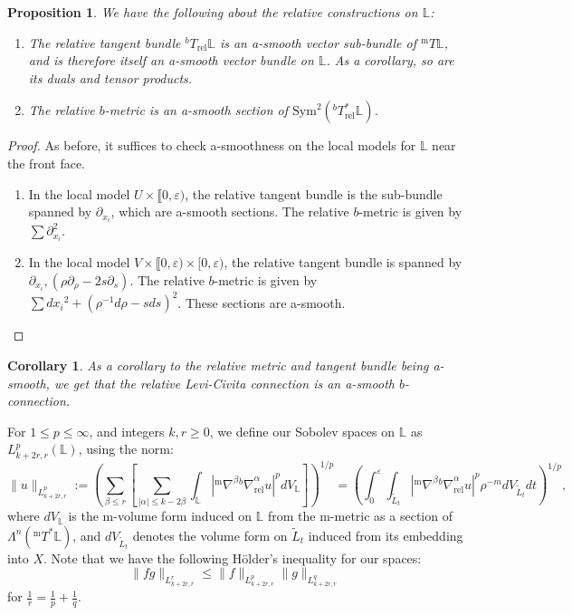 \documentclass[10pt, a4paper]{article}
\theoremstyle{plain}%
\newtheorem{prop}[theorem]{Proposition}
\newtheorem{coro}[theorem]{Corollary}
\theoremstyle{definition}
\numberwithin{figure}{section}
\numberwithin{equation}{section}
\newcommand{\bL}{\mathbb{L}}
\newcommand{\pa}{\partial}
\newcommand{\ep}{\varepsilon}
\newcommand{\tL}{\widetilde{L}}
\newcommand{\rel}{\mathrm{rel}}
\newcommand{\m}{\mathrm{m}}
\begin{document}
\begin{prop}
	We have the following about the relative constructions on $\bL$:
	\begin{enumerate}
		\item The relative tangent bundle $^bT_\rel\bL$ is an a-smooth vector sub-bundle of $^{\m}T\bL$, and is therefore itself an a-smooth vector bundle on $\bL$. As a corollary, so are its duals and tensor products.
		\item The relative $b$-metric is an a-smooth section of $\textrm{Sym}^2(^bT^*_\rel\bL)$. 
	\end{enumerate}
\end{prop}
\begin{proof}
	As before, it suffices to check a-smoothness on the local models for $\bL$ near the front face.
	\begin{enumerate}
		\item In the local model $U\times \llbracket0,\ep)$, the relative tangent bundle is the sub-bundle spanned by $\pa_{x_i}$, which are a-smooth sections. The relative $b$-metric is given by $\sum \pa_{x_i}^2$.
		\item In the local model $V\times\llbracket0,\ep)\times[0,\ep)$, the relative tangent bundle is spanned by $\pa_{x_i}, (\rho\pa_\rho-2s\pa_s)$. The relative $b$-metric is given by $\sum d{x_i}^2+(\rho^{-1}d\rho-sds)^2$.  These sections are a-smooth.
 \end{enumerate}
\end{proof}
\begin{coro}
	As a corollary to the relative metric and tangent bundle being a-smooth, we get that the relative Levi-Civita connection is an a-smooth $b$-connection.
\end{coro}

 For $1\leq p \leq \infty$, and integers $k,r\geq 0$, we define our Sobolev spaces on $\bL$ as $L^p_{k+2r,r}(\bL)$, using the norm: \[
\|u\|_{L^p_{k+2r,r}}:= \left( \sum_{\beta\leq r} \left[  \sum_{|\alpha|\leq k-2\beta}\int_{\mathbb{L}} |{^{\m}\nabla}^\beta{^b\nabla}_{\textrm{rel}}^\alpha u|^p dV_{\mathbb{L}} \right] \right)^{1/p} = \left(\int_0^\ep \int_{\tL_t} |{^{\m}\nabla}^\beta{^b\nabla}_{\textrm{rel}}^\alpha u|^p \rho^{-m}dV_{\tL_t}dt \right)^{1/p},
\]
where $dV_{\bL}$ is the m-volume form induced on $\bL$ from the m-metric as a section of $\Lambda^{n}({^{\m}T^*\bL})$, and $dV_{\tL_t}$ denotes the volume form on $\tL_t$ induced from its embedding into $X$. Note that we have the following H\"{o}lder's inequality for our spaces:\[
\|fg\|_{L^r_{k+2r,r}} \leq \|f\|_{L^p_{k+2r,r}}\|g\|_{L^q_{k+2r,r}}
\]
for $\frac{1}{r}=\frac{1}{p}+\frac{1}{q}$. 
\end{document}
